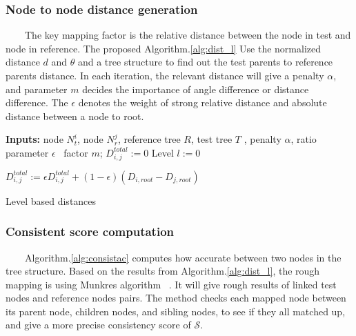 \documentclass[]{article}   %
\begin{document}
 
 \subsubsection{Node to node distance generation}
 \ \ \ \ The key mapping factor is the relative distance between the node in test and node in reference. The proposed Algorithm.\ref{alg:dist_l} Use the normalized distance $d$ and $\theta$ and a tree structure to find out the test parents to reference parents distance. In each iteration, the relevant distance will give a penalty $\alpha$, and parameter $m$ decides the importance of angle difference or distance difference. The $\epsilon$ denotes the weight of strong relative distance and absolute distance between a node to root.    
 
 \begin{algorithm}[]
 	\SetAlgoLined
 	\textbf{Inputs:}  node $N_t^i$, node $N_r^j$, reference tree $R$, test tree $T$ , penalty $\alpha$, ratio parameter $\epsilon$ \, factor $m$;
 	$D_{i,j}^{total} := 0$ \;
 	Level $l:= 0 $\;
 	
 	$D_{i,j}^{total} := \epsilon D_{i,j}^{total} + (1-\epsilon)(D_{i,root} - D_{j,root})$ \;
 	\caption{Level based distances}
 	\label{alg:dist_l}
 \end{algorithm}


 \subsubsection{Consistent score computation}
 \ \ \ \ Algorithm.\ref{alg:consistac} computes how accurate between two nodes in the tree structure. Based on the results from Algorithm.\ref{alg:dist_l}, the rough mapping is using Munkres algorithm ~\cite{munkres2014topology}. It will give rough results of linked test nodes and reference nodes pairs. The method checks each mapped node between its parent node, children nodes, and sibling nodes, to see if they all matched up, and give a more precise consistency score of $\mathcal{S}$.  
 
\end{document}
